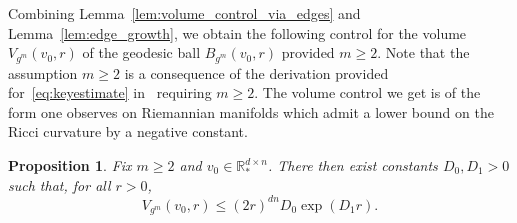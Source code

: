 \documentclass[11pt]{article}
\newtheorem{proposition}[thm]{Proposition}
\newcommand{\R}{\mathbb{R}}
\begin{document}
Combining Lemma~\ref{lem:volume_control_via_edges} and Lemma~\ref{lem:edge_growth}, we obtain the following control for the volume $V_{g^m}(v_0,r)$ of the geodesic ball $B_{g^m}(v_0,r)$ provided $m\geq 2$. Note that the assumption $m\geq 2$ is a consequence of the derivation provided for~\eqref{eq:keyestimate} in~\cite{cerqueira2024sobolevmetricsspacesdiscrete} requiring $m\geq 2$. The volume control we get is of the form one observes on Riemannian manifolds which admit a lower bound on the Ricci curvature by a negative constant.
\begin{proposition}\label{propn:growthcontrol}
    Fix $m\geq 2$ and $v_0\in \R^{d\times n}_*$. There then exist constants $D_0,D_1>0$ such that, for all $r>0$,
    \begin{displaymath}
        V_{g^m}(v_0,r)\leq \left(2r\right)^{dn}D_0\exp\left(D_1 r\right).
    \end{displaymath}
\end{proposition}
\end{document}
